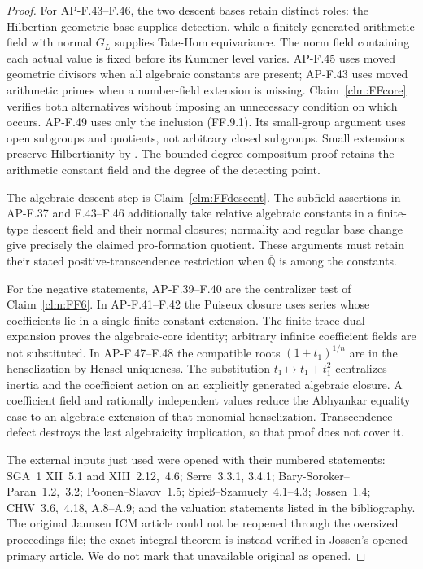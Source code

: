 \begin{proof}
For AP-F.43--F.46, the two descent bases retain distinct roles:
the Hilbertian geometric base supplies detection, while a finitely
generated arithmetic field with normal \(G_L\) supplies
Tate-Hom equivariance. The norm field containing each actual value
is fixed before its Kummer level varies. AP-F.45 uses moved
geometric divisors when all algebraic constants are present;
AP-F.43 uses moved arithmetic primes when a number-field extension
is missing. Claim~\ref{clm:FFcore} verifies both alternatives
without imposing an unnecessary condition on which occurs.
AP-F.49 uses only the inclusion (FF.9.1). Its small-group argument
uses open subgroups and quotients, not arbitrary closed subgroups.
Small extensions preserve Hilbertianity by
\citet[Theorem~4.4]{FF_BarySoroker2008}. The bounded-degree
compositum proof retains the arithmetic constant field and the
degree of the detecting point.

The algebraic descent step is Claim~\ref{clm:FFdescent}.
The subfield assertions in AP-F.37 and F.43--F.46 additionally
take relative algebraic constants in a finite-type descent field
and their normal closures; normality and regular base change
give precisely the claimed pro-formation quotient. These arguments
must retain their stated positive-transcendence restriction when
\(\overline{\mathbb Q}\) is among the constants.

For the negative statements, AP-F.39--F.40 are the centralizer
test of Claim~\ref{clm:FF6}. In AP-F.41--F.42 the Puiseux
closure uses series whose coefficients lie in a single finite
constant extension. The finite trace-dual expansion proves the
algebraic-core identity; arbitrary infinite coefficient fields
are not substituted. In AP-F.47--F.48 the compatible roots
\((1+t_1)^{1/n}\) are in the henselization by Hensel uniqueness.
The substitution \(t_1\mapsto t_1+t_1^2\) centralizes inertia
and the coefficient action on an explicitly generated algebraic
closure. A coefficient field and rationally independent values
reduce the Abhyankar equality case to an algebraic extension of
that monomial henselization. Transcendence defect destroys the
last algebraicity implication, so that proof does not cover it.

The external inputs just used were opened with their numbered
statements: SGA~1 XII~5.1 and XIII~2.12,~4.6; Serre~3.3.1,
3.4.1; Bary-Soroker--Paran~1.2,~3.2; Poonen--Slavov~1.5;
Spie\ss--Szamuely~4.1--4.3; Jossen~1.4; CHW~3.6,~4.18,
A.8--A.9; and the valuation statements listed in the bibliography.
The original Jannsen ICM article could not be reopened through
the oversized proceedings file; the exact integral theorem is
instead verified in Jossen's opened primary article. We do not
mark that unavailable original as opened.
\end{proof}

